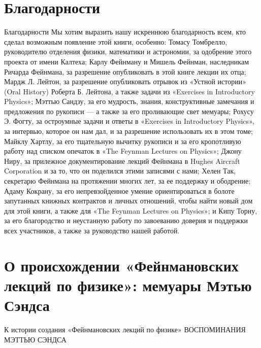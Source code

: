 \documentclass[10pt,oneside]{article}
\begin{document}
\clearpage
{}
\section*{Благодарности}
\label{tips-sec-4-благодарности}
Благодарности Мы хотим выразить нашу искреннюю благодарность всем, кто сделал возможным появление этой книги, особенно: Томасу Томбрелло, руководителю отделения физики, математики и астрономии, за одобрение этого проекта от имени Калтеха; Карлу Фейнману и Мишель Фейнман, наследникам Ричарда Фейнмана, за разрешение опубликовать в этой книге лекции их отца; Мардж Л. Лейтон, за разрешение опубликовать отрывок из «Устной истории» (Oral History) Роберта Б. Лейтона, а также задачи из «Exercises in Introductory Physics»; Мэттью Сандзу, за его мудрость, знания, конструктивные замечания и предложения по рукописи --- а также за его проливающие свет мемуары; Рохусу Э. Фогту, за остроумные задачи и ответы в «Exercises in Introductory Physics», за интервью, которое он нам дал, и за разрешение использовать их в этом томе; Майклу Хартлу, за его тщательную вычитку рукописи и за его кропотливую работу над списком опечаток в «The Feynman Lectures on Physics»; Джону Ниру, за прилежное документирование лекций Фейнмана в Hughes Aircraft Corporation и за то, что он поделился этими записями с нами; Хелен Так, секретарю Фейнмана на протяжении многих лет, за ее поддержку и ободрение; Адаму Кокрану, за его непревзойденное умение ориентироваться в болоте запутанных книжных контрактов и личных отношений, чтобы найти новый дом для этой книги, а также для «The Feynman Lectures on Physics»; и Кипу Торну, за его благородство и неустанную работу по завоеванию доверия и поддержки всех участников, а также за руководство нашей работой.\par

\clearpage
{}
\section*{О происхождении «Фейнмановских лекций по физике»: мемуары Мэтью Сэндса}
\label{tips-sec-5-о-происхождении-фейнмановских-лекций-по-физике-мемуары-мэтью-сэндса}
К истории создания «Фейнмановских лекций по физике» ВОСПОМИНАНИЯ МЭТТЬЮ СЭНДСА\par
\end{document}

